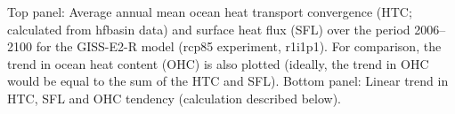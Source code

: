 \label{fig:giss_full}
Top panel: Average annual mean ocean heat transport convergence (HTC; calculated from hfbasin data) and surface heat flux (SFL) over the period 2006--2100 for the GISS-E2-R model (rcp85 experiment, r1i1p1). For comparison, the trend in ocean heat content (OHC) is also plotted (ideally, the trend in OHC would be equal to the sum of the HTC and SFL). Bottom panel: Linear trend in HTC, SFL and OHC tendency (calculation described below).